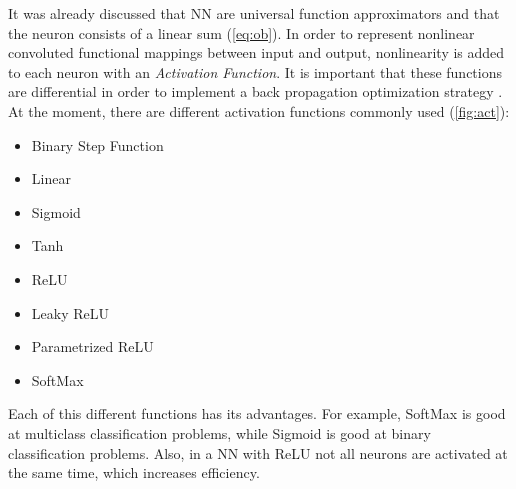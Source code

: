 It was already discussed that NN are universal function approximators and that the neuron consists of a linear sum (\cref{eq:ob}). 
In order to represent nonlinear convoluted functional mappings between input and output, nonlinearity is added to each neuron with an \emph{Activation Function}. 
It is important that these functions are differential in order to implement a back propagation optimization strategy \cite{sharma2017activation}. \\
At the moment, there are different activation functions commonly used (\cref{fig:act}):
\begin{itemize}
	\item Binary Step Function
	\item Linear
	\item Sigmoid
	\item Tanh
	\item ReLU
	\item Leaky ReLU
	\item Parametrized ReLU
	\item SoftMax
\end{itemize} 
Each of this different functions has its advantages. For example, SoftMax is good at multiclass classification problems, 
while Sigmoid is good at binary classification problems. Also, in a NN with ReLU not all neurons are activated at the same time, which increases efficiency.

\newpage

